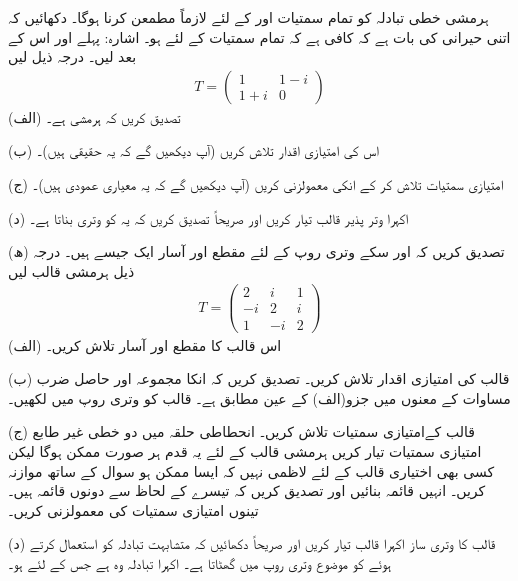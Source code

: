 ہرمشی خطی تبادلہ کو تمام سمتیات  اور  کے لئے لازماً  مطمعن کرنا ہوگا۔ دکھائیں کہ اتنی حیرانی کی بات ہے کہ کافی ہے کہ تمام سمتیات  کے لئے  ہو۔ اشارہ: پہلے  اور اس کے بعد  لیں۔ 
درجہ ذیل لیں
\begin{align*}
	T=
	\begin{pmatrix}
		1 & 1-i\\
		1+i & 0
	\end{pmatrix}
\end{align*}
(الف) تصدیق کریں کہ  ہرمشی ہے۔

(ب) اس کی امتیازی اقدار تلاش کریں (آپ دیکھیں گے کہ یہ حقیقی ہیں)۔

(ج) امتیازی سمتیات تلاش کر کے انکی معمولزنی کریں (آپ دیکھیں گے کہ یہ معیاری عمودی ہیں)۔

(د) اکہرا وتر پذیر قالب  تیار کریں اور صریحاً تصدیق کریں کہ یہ  کو وتری بناتا ہے۔

(ھ) تصدیق کریں کہ  اور سکے وتری روپ کے لئے مقطع  اور آسار  ایک جیسے ہیں۔
درجہ ذیل ہرمشی قالب لیں
\begin{align*}
	T=
	\begin{pmatrix}
		2 & i & 1\\
		-i & 2 & i\\
		1 & -i & 2
	\end{pmatrix}
\end{align*}
(الف) اس قالب کا مقطع  اور آسار  تلاش کریں۔

(ب) قالب  کی امتیازی اقدار تلاش کریں۔ تصدیق کریں کہ انکا مجموعہ اور حاصل ضرب مساوات  کے معنوں میں جزو(الف) کے عین مطابق ہے۔ قالب  کو وتری روپ میں لکھیں۔

(ج) قالب  کےامتیازی سمتیات تلاش کریں۔ انحطاطی حلقہ میں دو خطی غیر طابع امتیازی سمتیات تیار کریں ہرمشی قالب کے لئے یہ قدم ہر صورت ممکن ہوگا لیکن کسی بھی اختیاری قالب کے لئے لاظمی نہیں کہ ایسا ممکن ہو سوال  کے ساتھ موازنہ کریں۔ انہیں قائمہ بنائیں اور تصدیق کریں کہ تیسرے کے لحاظ سے دونوں قائمہ ہیں۔ تینوں امتیازی سمتیات کی معمولزنی کریں۔

(د) قالب  کا وتری ساز  اکہرا قالب  تیار کریں اور صریحاً دکھائیں کہ متشابہت تبادلہ  کو استعمال کرتے ہوئے  کو موضوع وتری روپ میں گھٹاتا ہے۔
اکہرا تبادلہ وہ ہے جس کے لئے  ہو۔

